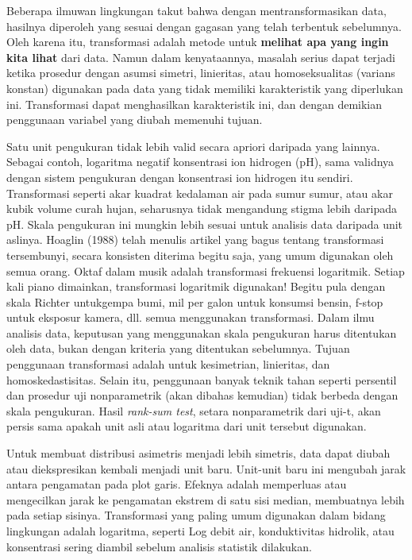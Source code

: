 \documentclass[]{book}
\begin{document}
Beberapa ilmuwan lingkungan takut bahwa dengan mentransformasikan data,
hasilnya diperoleh yang sesuai dengan gagasan yang telah terbentuk
sebelumnya. Oleh karena itu, transformasi adalah metode untuk
\textbf{melihat apa yang ingin kita lihat} dari data. Namun dalam
kenyataannya, masalah serius dapat terjadi ketika prosedur dengan asumsi
simetri, linieritas, atau homoseksualitas (varians konstan) digunakan
pada data yang tidak memiliki karakteristik yang diperlukan ini.
Transformasi dapat menghasilkan karakteristik ini, dan dengan demikian
penggunaan variabel yang diubah memenuhi tujuan.

Satu unit pengukuran tidak lebih valid secara apriori daripada yang
lainnya. Sebagai contoh, logaritma negatif konsentrasi ion hidrogen
(pH), sama validnya dengan sistem pengukuran dengan konsentrasi ion
hidrogen itu sendiri. Transformasi seperti akar kuadrat kedalaman air
pada sumur sumur, atau akar kubik volume curah hujan, seharusnya tidak
mengandung stigma lebih daripada pH. Skala pengukuran ini mungkin lebih
sesuai untuk analisis data daripada unit aslinya. Hoaglin (1988) telah
menulis artikel yang bagus tentang transformasi tersembunyi, secara
konsisten diterima begitu saja, yang umum digunakan oleh semua orang.
Oktaf dalam musik adalah transformasi frekuensi logaritmik. Setiap kali
piano dimainkan, transformasi logaritmik digunakan! Begitu pula dengan
skala Richter untukgempa bumi, mil per galon untuk konsumsi bensin,
f-stop untuk eksposur kamera, dll. semua menggunakan transformasi. Dalam
ilmu analisis data, keputusan yang menggunakan skala pengukuran harus
ditentukan oleh data, bukan dengan kriteria yang ditentukan sebelumnya.
Tujuan penggunaan transformasi adalah untuk kesimetrian, linieritas, dan
homoskedastisitas. Selain itu, penggunaan banyak teknik tahan seperti
persentil dan prosedur uji nonparametrik (akan dibahas kemudian) tidak
berbeda dengan skala pengukuran. Hasil \emph{rank-sum test}, setara
nonparametrik dari uji-t, akan persis sama apakah unit asli atau
logaritma dari unit tersebut digunakan.

Untuk membuat distribusi asimetris menjadi lebih simetris, data dapat
diubah atau diekspresikan kembali menjadi unit baru. Unit-unit baru ini
mengubah jarak antara pengamatan pada plot garis. Efeknya adalah
memperluas atau mengecilkan jarak ke pengamatan ekstrem di satu sisi
median, membuatnya lebih pada setiap sisinya. Transformasi yang paling
umum digunakan dalam bidang lingkungan adalah logaritma, seperti Log
debit air, konduktivitas hidrolik, atau konsentrasi sering diambil
sebelum analisis statistik dilakukan.
\end{document}
